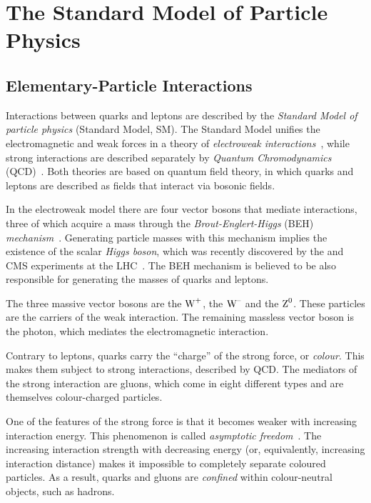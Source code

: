 \section{The Standard Model of Particle Physics}
\label{sec:intro_SM}

\subsection{Elementary-Particle Interactions}
\label{subsec:intro_SM_int}

Interactions between quarks and leptons are described by the \emph{Standard Model of particle physics} (Standard Model, SM). The Standard
Model unifies the electromagnetic and weak forces in a theory of \emph{electroweak
interactions}~\cite{Glashow:1961tr,*Weinberg:1967tq,*Salam:1968rm}, while strong interactions are described separately by \emph{Quantum
Chromodynamics} (QCD)~\cite{Fritzsch:1973pi}. Both theories are based on quantum field theory, in which quarks and leptons are described as
fields that interact via bosonic fields.

In the electroweak model there are four vector bosons that mediate interactions, three of which acquire a mass through the
\emph{Brout-Englert-Higgs} (BEH) \emph{mechanism}~\cite{Englert:1964et,*Higgs:1964ia,*Higgs:1964pj,*Guralnik:1964eu}. Generating particle
masses with this mechanism implies the existence of the scalar \emph{Higgs boson}, which was recently discovered by the \atlas{} and
CMS experiments at the LHC~\cite{Aad:2012tfa,*Chatrchyan:2012ufa}. The BEH mechanism is believed to be also responsible for generating the
masses of quarks and leptons.

The three massive vector bosons are the $\text{W}^{\text{+}}$, the $\text{W}^{\text{--}}$ and the $\text{Z}^{\text{0}}$. These particles are the carriers of the weak interaction. The
remaining massless vector boson is the photon, which mediates the electromagnetic interaction.

Contrary to leptons, quarks carry the ``charge'' of the strong force, or \emph{colour}. This makes them subject to strong interactions,
described by QCD. The mediators of the strong interaction are gluons, which come in eight different types and are themselves colour-charged
particles.

One of the features of the strong force is that it becomes weaker with increasing interaction energy. This phenomenon is called
\emph{asymptotic freedom}~\cite{Gross:1973id,*Politzer:1973fx}. The increasing interaction strength with decreasing energy (or,
equivalently, increasing interaction distance) makes it impossible to completely separate coloured particles. As a result, quarks and
gluons are \emph{confined} within colour-neutral objects, such as hadrons.

